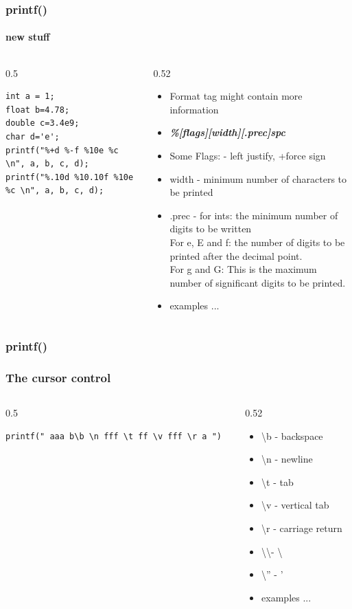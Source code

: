 \documentclass[10pt]{beamer}
\begin{document}
\begin{frame}[fragile]
  \frametitle{printf()}
  \framesubtitle{new stuff}
  \begin{columns}
    \begin{column}{0.5\textwidth}
\begin{lstlisting}
int a = 1;
float b=4.78;
double c=3.4e9;
char d='e';
printf("%+d %-f %10e %c \n", a, b, c, d);
printf("%.10d %10.10f %10e %c \n", a, b, c, d);
\end{lstlisting}
    \end{column}
    \begin{column}{0.52\textwidth}
      \begin{itemize}
        \item Format tag might contain more information
        \item \textit{\bf{\%[flags][width][.prec]spc}}
        \item Some Flags: - left justify, +force sign
        \item width - minimum number of characters to be printed
        \item .prec - for ints: the minimum number of digits to be written\\
        For e, E and f: the number of digits to be printed after the decimal point.\\
        For g and G: This is the maximum number of significant digits to be printed.
        \item examples ...
      \end{itemize}
    \end{column}
  \end{columns}
\end{frame}

\begin{frame}[fragile]
  \frametitle{printf()}
  \frametitle{The cursor control}
  \begin{columns}
    \begin{column}{0.5\textwidth}
\begin{lstlisting}
printf(" aaa b\b \n fff \t ff \v fff \r a ")
\end{lstlisting}
    \end{column}
    \begin{column}{0.52\textwidth}
      \begin{itemize}
        \item \textbackslash b - backspace
        \item \textbackslash n - newline
        \item \textbackslash t - tab
        \item \textbackslash v - vertical tab
        \item \textbackslash r - carriage return
        \item \textbackslash \textbackslash - \textbackslash
        \item \textbackslash '' - '
        \item examples ...
      \end{itemize}
    \end{column}
  \end{columns}
\end{frame}
\end{document}
